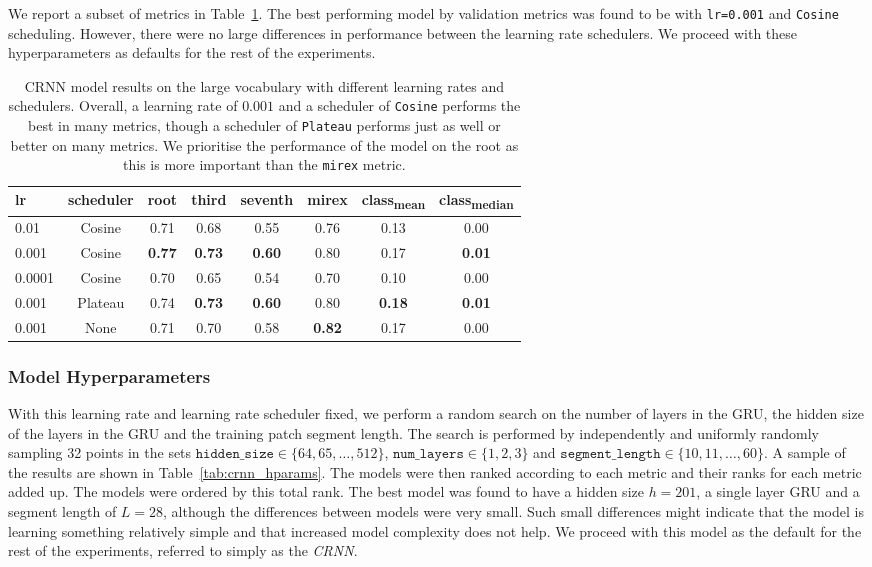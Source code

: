 We report a subset of metrics in Table~\ref{tab:crnn_lr}. The best performing model by validation metrics was found to be with \texttt{lr=0.001} and \texttt{Cosine} scheduling. However, there were no large differences in performance between the learning rate schedulers. We proceed with these hyperparameters as defaults for the rest of the experiments.

\begin{table}[H]
    \centering
    \begin{tabular}{lccccccc}
        \toprule
        lr & scheduler & root & third & seventh & mirex & class\textsubscript{mean} & class\textsubscript{median} \\
        \midrule
        0.01 & Cosine & 0.71 & 0.68 & 0.55 & 0.76 & 0.13 & 0.00 \\
        0.001 & Cosine & \textbf{0.77} & \textbf{0.73} & \textbf{0.60} & 0.80 & 0.17 & \textbf{0.01} \\
        0.0001 & Cosine & 0.70 & 0.65 & 0.54 & 0.70 & 0.10 & 0.00 \\
        \midrule
        0.001 & Plateau & 0.74 & \textbf{0.73} & \textbf{0.60} & 0.80 & \textbf{0.18} & \textbf{0.01} \\
        0.001 & None & 0.71 & 0.70 & 0.58 & \textbf{0.82} & 0.17 & 0.00 \\
        \bottomrule
    \end{tabular}
    \caption{CRNN model results on the large vocabulary with different learning rates and schedulers. Overall, a learning rate of $0.001$ and a scheduler of \texttt{Cosine} performs the best in many metrics, though a scheduler of \texttt{Plateau} performs just as well or better on many metrics. We prioritise the performance of the model on the root as this is more important than the \texttt{mirex} metric. }\label{tab:crnn_lr}
\end{table}

\subsubsection{Model Hyperparameters}

With this learning rate and learning rate scheduler fixed, we perform a random search on the number of layers in the GRU, the hidden size of the layers in the GRU and the training patch segment length. The search is performed by independently and uniformly randomly sampling 32 points in the sets $\texttt{hidden\_size}\in\{64,65,\ldots,512\}$, $\texttt{num\_layers}\in\{1,2,3\}$ and $\texttt{segment\_length}\in\{10,11,\ldots,60\}$. A sample of the results are shown in Table~\ref{tab:crnn_hparams}. The models were then ranked according to each metric and their ranks for each metric added up. The models were ordered by this total rank. The best model was found to have a hidden size $h=201$, a single layer GRU and a segment length of $L=28$, although the differences between models were very small. Such small differences might indicate that the model is learning something relatively simple and that increased model complexity does not help. We proceed with this model as the default for the rest of the experiments, referred to simply as the \emph{CRNN}.

